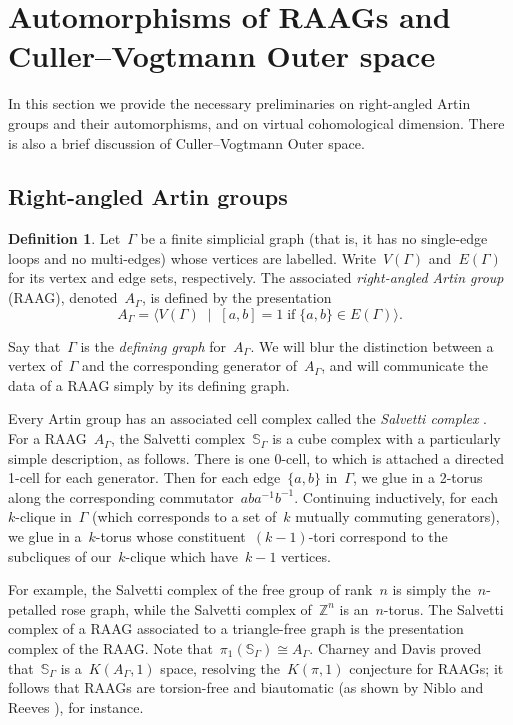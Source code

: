 \documentclass[11pt]{amsart}
\theoremstyle{definition}
\theoremstyle{definition}
\theoremstyle{definition}
\theoremstyle{definition}
\newtheorem{definition}[theorem]{Definition}
\newcommand{\raag}{A_\Gamma} %
\newcommand{\sal}{\mathbb{S}_{\Gamma}} %
\begin{document}
\section{Automorphisms of RAAGs and Culler--Vogtmann Outer space}\label{sec:auts of raags and CV Outer space}

In this section we provide the necessary preliminaries on right-angled Artin groups and their automorphisms, and on virtual cohomological dimension. There is also a brief discussion of Culler--Vogtmann Outer space.

\subsection{Right-angled Artin groups}\label{subsec:raags}

\begin{definition}
    Let~$\Gamma$ be a finite simplicial graph (that is, it has no single-edge loops and no multi-edges) whose vertices are labelled. Write~$V(\Gamma)$ and~$E(\Gamma)$ for its vertex and edge sets, respectively. The associated \emph{right-angled Artin group} (RAAG), denoted~$\raag$, is defined by the presentation \[\raag = \langle V(\Gamma) \;\;\vert\;\; [a, b] = 1 \;\text{if}\; \{a, b\} \in E(\Gamma)\rangle.\]

    Say that~$\Gamma$ is the \emph{defining graph} for~$\raag$. We will blur the distinction between a vertex of~$\Gamma$ and the corresponding generator of~$\raag$, and will communicate the data of a RAAG simply by its defining graph.
\end{definition}

Every Artin group has an associated cell complex called the \emph{Salvetti complex} \cite{SalvettiTopologyHyperplaneComplements87}. For a RAAG~$\raag$, the Salvetti complex~$\sal$ is a cube complex with a particularly simple description, as follows. There is one 0-cell, to which is attached a directed 1-cell for each generator. Then for each edge~$\{a, b\}$ in~$\Gamma$, we glue in a 2-torus along the corresponding commutator~$aba^{-1}b^{-1}$. Continuing inductively, for each~$k$-clique in~$\Gamma$ (which corresponds to a set of~$k$ mutually commuting generators), we glue in a~$k$-torus whose constituent~$(k-1)$-tori correspond to the subcliques of our~$k$-clique which have~$k-1$ vertices. 

For example, the Salvetti complex of the free group of rank~$n$ is simply the~$n$-petalled rose graph, while the Salvetti complex of~$\mathbb{Z}^n$ is an~$n$-torus. The Salvetti complex of a RAAG associated to a triangle-free graph is the presentation complex of the RAAG. Note that~$\pi_1(\sal) \cong \raag$. Charney and Davis proved \cite{CharneyDavisKpi195} that~$\sal$ is a~$K(\raag, 1)$ space, resolving the~$K(\pi, 1)$ conjecture for RAAGs; it follows that RAAGs are torsion-free and biautomatic (as shown by Niblo and Reeves \cite{NibloReevesCCsComplexity98}), for instance. 
\end{document}
